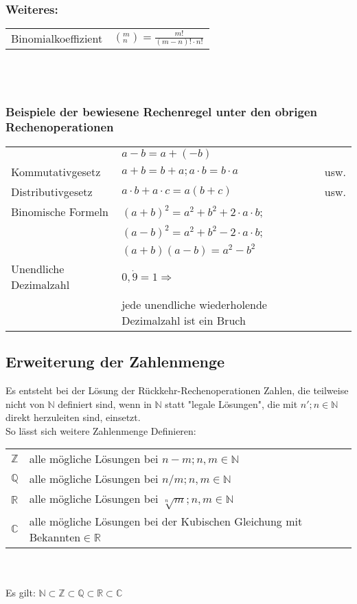 \documentclass{article}
\begin{document}
    \subsubsection*{Weiteres:}
    \begin{tabular}{ll}
        Binomialkoeffizient&  $( _{n}^{m}) = \frac{m!}{(m-n)!\cdot n!}$\\
        
    \end{tabular}\\\\
    \subsubsection{Beispiele der bewiesene Rechenregel unter den obrigen Rechenoperationen}
    \begin{tabular}{lll}
        & $a-b=a+(-b)$\\
        Kommutativgesetz& $a+b=b+a;a\cdot  b=b\cdot a$&usw.\\
        Distributivgesetz& $a\cdot b + a\cdot c= a(b+c)$&usw.\\
        Binomische Formeln& $(a+b)^2=a^2+b^2+2\cdot a\cdot b$;\\&$(a-b)^2=a^2+b^2-2\cdot a\cdot b$;\\&$(a+b)(a-b)=a^2-b^2$\\
        Unendliche Dezimalzahl& $0,\dot{9}=1\Rightarrow $\\&jede unendliche wiederholende Dezimalzahl ist ein Bruch
    \end{tabular}

    \subsection{Erweiterung der Zahlenmenge}
    Es entsteht bei der Lösung der Rückkehr-Rechenoperationen Zahlen, die teilweise nicht von $\mathbb{N}$ definiert sind, wenn in $\mathbb{N}$ statt "legale Lösungen", die mit $n';n\in \mathbb{N}$ direkt herzuleiten sind, einsetzt.\\
    So lässt sich weitere Zahlenmenge Definieren:\\
    \begin{tabular}{ll}
        $\mathbb{Z}$& alle mögliche Lösungen bei $n-m;n,m\in \mathbb{N}$\\
        $\mathbb{Q}$& alle mögliche Lösungen bei $n/m;n,m\in \mathbb{N}$\\
        $\mathbb{R}$& alle mögliche Lösungen bei $\sqrt[n]{m};n,m\in \mathbb{N}$\\
        $\mathbb{C}$& alle mögliche Lösungen bei der Kubischen Gleichung mit Bekannten$\in \mathbb{R}$\\
    \end{tabular}\\\\
    Es gilt: $\mathbb{N}\subset\mathbb{Z}\subset\mathbb{Q}\subset\mathbb{R}\subset\mathbb{C} $
\end{document}
